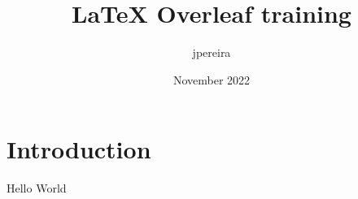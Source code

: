 \documentclass{article}
\title{LaTeX Overleaf training}
\author{jpereira}
\date{November 2022}
\begin{document}
\maketitle

\section{Introduction}
Hello World 
\end{document}
